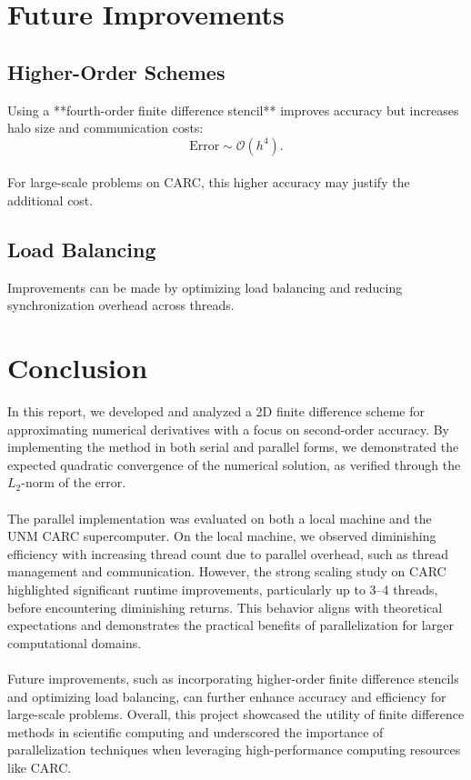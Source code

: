 \documentclass[12pt]{article}
\begin{document}
\section{Future Improvements}
\subsection{Higher-Order Schemes}
Using a **fourth-order finite difference stencil** improves accuracy but increases halo size and communication costs:
\[
\text{Error} \sim \mathcal{O}(h^4).
\]
\\
\noindent For large-scale problems on CARC, this higher accuracy may justify the additional cost.
\subsection{Load Balancing}
Improvements can be made by optimizing load balancing and reducing synchronization overhead across threads.
\newpage

\section{Conclusion}
In this report, we developed and analyzed a 2D finite difference scheme for approximating numerical derivatives with a focus on second-order accuracy. By implementing the method in both serial and parallel forms, we demonstrated the expected quadratic convergence of the numerical solution, as verified through the $L_2$-norm of the error.
\\
\\
The parallel implementation was evaluated on both a local machine and the UNM CARC supercomputer. On the local machine, we observed diminishing efficiency with increasing thread count due to parallel overhead, such as thread management and communication. However, the strong scaling study on CARC highlighted significant runtime improvements, particularly up to 3–4 threads, before encountering diminishing returns. This behavior aligns with theoretical expectations and demonstrates the practical benefits of parallelization for larger computational domains.
\\
\\
Future improvements, such as incorporating higher-order finite difference stencils and optimizing load balancing, can further enhance accuracy and efficiency for large-scale problems. Overall, this project showcased the utility of finite difference methods in scientific computing and underscored the importance of parallelization techniques when leveraging high-performance computing resources like CARC.
\end{document}
